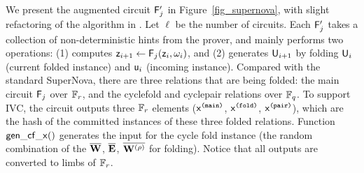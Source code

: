 We present the augmented circuit $\mathsf{F}_{j}'$ in  Figure\ \ref{fig_supernova},
with slight refactoring of the algorithm in \cite[Construction 1]{SuperNova}.
Let $\ell$ be the number of circuits.
Each $\mathsf{F}_{j}'$ takes a collection of non-deterministic
hints from the prover, and mainly performs two operations: (1) computes
$\mathsf{z}_{i+1} \leftarrow \mathsf{F}_{j}(\mathsf{z}_i, \omega_i)$, and (2)
generates $\mathsf{U}_{i+1}$ by folding
$\mathsf{U}_{i}$ (current folded instance) and $\mathsf{u}_{i}$ (incoming instance).
Compared with the standard SuperNova,  
there are three relations that are being folded: the 
main circuit $\mathsf{F}_{j}$ over $\mathbb{F}_r$, and the cyclefold and cyclepair
relations over $\mathbb{F}_q$. To support IVC, the circuit 
outputs three $\mathbb{F}_r$ elements ($\mathsf{x}^\texttt{(main)}$, $\mathsf{x}^\texttt{(fold)}$, $\mathsf{x}^\texttt{(pair)}$), 
which are the hash of the committed instances of these three folded relations. 
Function $\mathsf{gen\_cf\_x}()$ generates the input for the cycle fold
instance (the random combination of the $\overline{{{\mathbf {W}}}}$,
$\overline{{{\mathbf {E}}}}$, $\overline{{{\mathbf {W}}}^{(\rho)}}$
for folding). Notice that all outputs are converted to limbs of $\mathbb{F}_r$.

